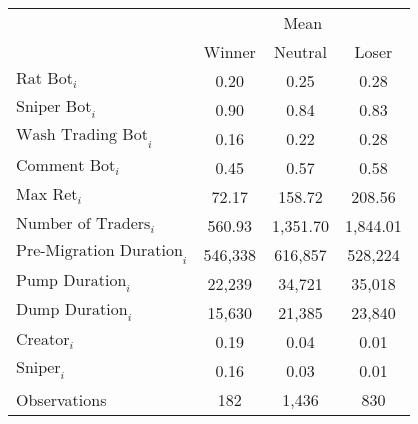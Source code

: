 \begin{tabular}{lccc}
\toprule
& \multicolumn{3}{c}{Mean} \\
\cmidrule{2-4}
& Winner & Neutral & Loser \\
\midrule
$\text{Rat Bot}_{i}$ & 0.20 & 0.25 & 0.28 \\
$\text{Sniper Bot}_{i}$ & 0.90 & 0.84 & 0.83 \\
$\text{Wash Trading Bot}_{i}$ & 0.16 & 0.22 & 0.28 \\
$\text{Comment Bot}_{i}$ & 0.45 & 0.57 & 0.58 \\
$\text{Max Ret}_{i}$ & 72.17 & 158.72 & 208.56 \\
$\text{Number of Traders}_{i}$ & 560.93 & 1,351.70 & 1,844.01 \\
$\text{Pre-Migration Duration}_{i}$ & 546,338 & 616,857 & 528,224 \\
$\text{Pump Duration}_{i}$ & 22,239 & 34,721 & 35,018 \\
$\text{Dump Duration}_{i}$ & 15,630 & 21,385 & 23,840 \\
$\text{Creator}_{i}$ & 0.19 & 0.04 & 0.01 \\
$\text{Sniper}_{i}$ & 0.16 & 0.03 & 0.01 \\
\midrule
Observations & 182 & 1,436 & 830 \\
\bottomrule
\end{tabular}
